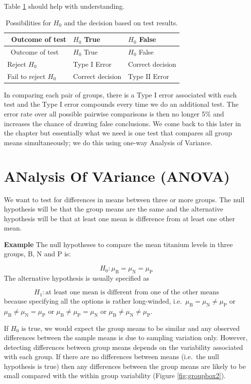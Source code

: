 \documentclass[
  oneside]{krantz}
\begin{document}
Table \ref{tab:type12} should help with understanding.

\begin{longtable}[]{@{}lll@{}}
\caption{\label{tab:type12} Possibilities for \(H_0\) and the decision based on test results.}\tabularnewline
\toprule
~Outcome of test & \(H_0\) True & \(H_0\) False\tabularnewline
\midrule
\endfirsthead
\toprule
~Outcome of test & \(H_0\) True & \(H_0\) False\tabularnewline
\midrule
\endhead
Reject \(H_0\) & Type I Error & Correct decision\tabularnewline
Fail to reject \(H_0\) & Correct decision & Type II Error\tabularnewline
\bottomrule
\end{longtable}

In comparing each pair of groups, there is a Type I error associated with each test and the Type I error compounds every time we do an additional test. The error rate over all possible pairwise comparisons is then no longer 5\% and increases the chance of drawing false conclusions. We come back to this later in the chapter but essentially what we need is one test that compares all group means simultaneously; we do this using one-way Analysis of Variance.

\hypertarget{analysis-of-variance-anova}{%
\section{ANalysis Of VAriance (ANOVA)}\label{analysis-of-variance-anova}}

We want to test for differences in means between three or more groups. The null hypothesis will be that the group means are the same and the alternative hypothesis will be that at least one mean is difference from at least one other mean.

\textbf{Example} The null hypotheses to compare the mean titanium levels in three groups, B, N and P is:

\[ H_0: \mu_{\textrm{B}} = \mu_{\textrm{N}} = \mu_{\textrm{P}} \]
The alternative hypothesis is usually specified as

\[H_1: \textrm{at least one mean is different from one of the other means}\]
because specifying all the options is rather long-winded, i.e.~\(\mu_{\textrm{B}} = \mu_{\textrm{N}} \ne \mu_{\textrm{P}}\) or
\(\mu_{\textrm{B}} \ne \mu_{\textrm{N}} = \mu_{\textrm{P}}\) or
\(\mu_{\textrm{B}} \ne \mu_{\textrm{P}} = \mu_{\textrm{N}}\) or
\(\mu_{\textrm{B}} \ne \mu_{\textrm{N}} \ne \mu_{\textrm{P}}\).

If \(H_0\) is true, we would expect the group means to be similar and any observed differences between the sample means is due to sampling variation only. However, detecting differences between group means depends on the variability associated with each group. If there are no differences between means (i.e.~the null hypothesis is true) then any differences between the group means are likely to be small compared with the within group variability (Figure \ref{fig:groupbox2}).
\end{document}
